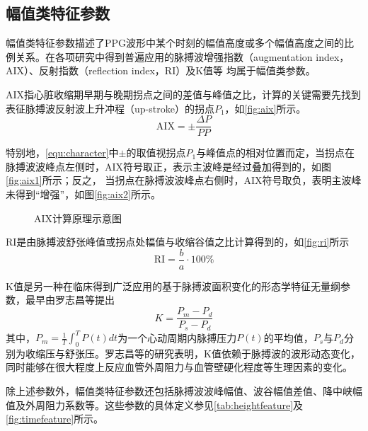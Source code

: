 \subsection{幅值类特征参数}

幅值类特征参数描述了PPG波形中某个时刻的幅值高度或多个幅值高度之间的比例关系。在各项研究中得到普遍应用的脉搏波增强指数（augmentation index，AIX）、反射指数（reflection index，RI）及K值等
均属于幅值类参数。

AIX指心脏收缩期早期与晚期拐点之间的差值与峰值之比，计算的关键需要先找到表征脉搏波反射波上升冲程（up-stroke）的拐点$P_1$，如\autoref{fig:aix}所示\cite{Su2014}。
\begin{equation}
    \label{equ:aix}
    \text{AIX} = \pm \frac{\Delta P}{PP}
\end{equation}

特别地，\autoref{equ:character}中$\pm$的取值视拐点$P_1$与峰值点的相对位置而定，当拐点在脉搏波波峰点左侧时，AIX符号取正，表示主波峰是经过叠加得到的，如图\autoref{fig:aix1}所示；反之，
当拐点在脉搏波波峰点右侧时，AIX符号取负，表明主波峰未得到“增强”，如图\autoref{fig:aix2}所示。
\begin{figure}[htbp]
    \centering
    \quad
    \caption[AIX计算原理示意图]{\label{fig:aix}AIX计算原理示意图\cite{Su2014}}
\end{figure}

RI是由脉搏波舒张峰值或拐点处幅值与收缩谷值之比计算得到的，如\autoref{fig:ri}所示\cite{Su2014,Elgendi2012}
\begin{equation}
    \label{equ:ri}
    \text{RI} = \frac{b}{a} \cdot 100\%
\end{equation}

K值是另一种在临床得到广泛应用的基于脉搏波面积变化的形态学特征无量纲参数，最早由罗志昌等\cite{Luo1988,PPGYY}提出
\begin{equation}
    \label{equ:ppgk}
    K=\frac{P_m-P_d}{P_s-P_d}
\end{equation}
其中，$P_m=\frac{1}{T}\int_{0}^{T}P(t)dt$为一个心动周期内脉搏压力$P(t)$的平均值，$P_s$与$P_d$分别为收缩压与舒张压。罗志昌等\cite{Luo1988,PPGYY}的研究表明，K值依赖于脉搏波的波形动态变化，
同时能够在很大程度上反应血管外周阻力与血管壁硬化程度等生理因素的变化。

除上述参数外，幅值类特征参数还包括脉搏波波峰幅值、波谷幅值差值、降中峡幅值及外周阻力系数等\cite{cwl,mmt}。这些参数的具体定义参见\autoref{tab:heightfeature}及\autoref{fig:timefeature}所示。

